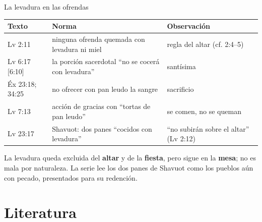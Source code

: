 \documentclass[hyperref={bookmarks=false},aspectratio=169]{beamer}
\newcommand{\destacar}[1]{\textbf{\textcolor{tierraroja}{#1}}}
\begin{document}
\begin{frame}{La levadura en las ofrendas}
\scriptsize\renewcommand{\arraystretch}{1.13}
\begin{tabular}{@{}L{2.2cm}L{5.0cm}L{4.8cm}@{}}
\toprule
\textbf{Texto} & \textbf{Norma} & \textbf{Observación} \\ \midrule
Lv 2:11 & ninguna ofrenda quemada con levadura ni miel & regla del altar (cf. 2:4--5) \\
Lv 6:17 [6:10] & la porción sacerdotal ``no se cocerá con levadura'' & santísima \\
Éx 23:18; 34:25 & no ofrecer con pan leudo la sangre & sacrificio \\
Lv 7:13 & acción de gracias con ``tortas de pan leudo'' & se comen, no se queman \\
Lv 23:17 & Shavuot: dos panes ``cocidos con levadura'' & ``no subirán sobre el altar'' (Lv 2:12) \\
\bottomrule
\end{tabular}\par\medskip
\small La levadura queda excluida del \destacar{altar} y de la \destacar{fiesta}, pero sigue en la \destacar{mesa}; no es mala por naturaleza. La serie lee los dos panes de Shavuot como los pueblos aún con pecado, presentados para su redención.
\end{frame}

\section{Literatura}
\end{document}

